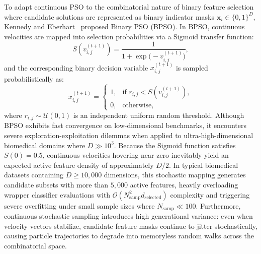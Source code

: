 \documentclass[final,5p,times,fleqn]{elsarticle}
\begin{document}
To adapt continuous PSO to the combinatorial nature of binary feature selection where candidate solutions are represented as binary indicator masks $\mathbf{x}_i \in \{0, 1\}^D$, Kennedy and Eberhart~\cite{kennedy1997} proposed Binary PSO (BPSO). In BPSO, continuous velocities are mapped into selection probabilities via a Sigmoid transfer function:
\begin{equation}
S(v_{i,j}^{(t+1)}) = \frac{1}{1 + \exp\bigl(-v_{i,j}^{(t+1)}\bigr)},
\label{eq:bpsosigmoid}
\end{equation}
and the corresponding binary decision variable $x_{i,j}^{(t+1)}$ is sampled probabilistically as:
\begin{equation}
x_{i,j}^{(t+1)} = \begin{cases}
1, & \text{if } r_{i,j} < S(v_{i,j}^{(t+1)}),\\[2pt]
0, & \text{otherwise},
\end{cases}
\label{eq:bpso_sampling}
\end{equation}
where $r_{i,j} \sim \mathcal{U}(0, 1)$ is an independent uniform random threshold. Although BPSO exhibits fast convergence on low-dimensional benchmarks, it encounters severe exploration-exploitation dilemmas when applied to ultra-high-dimensional biomedical domains where $D \gg 10^3$. Because the Sigmoid function satisfies $S(0) = 0.5$, continuous velocities hovering near zero inevitably yield an expected active feature density of approximately $D/2$. In typical biomedical datasets containing $D \ge 10{,}000$ dimensions, this stochastic mapping generates candidate subsets with more than $5{,}000$ active features, heavily overloading wrapper classifier evaluations with $\mathcal{O}(N_{\mathrm{samp}}^2 d_{\mathrm{selected}})$ complexity and triggering severe overfitting under small sample sizes where $N_{\mathrm{samp}} \ll 100$. Furthermore, continuous stochastic sampling introduces high generational variance: even when velocity vectors stabilize, candidate feature masks continue to jitter stochastically, causing particle trajectories to degrade into memoryless random walks across the combinatorial space.
\end{document}
